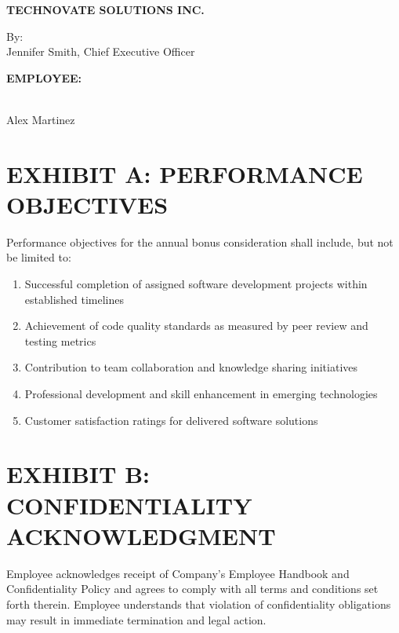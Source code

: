 \documentclass[12pt,letterpaper]{article}
\begin{document}
\vspace{1cm}
\noindent \textbf{TECHNOVATE SOLUTIONS INC.}

\vspace{0.5cm}
\noindent By: \underline{\hspace{3in}}\\
Jennifer Smith, Chief Executive Officer

\vspace{1cm}
\noindent \textbf{EMPLOYEE:}

\vspace{0.5cm}
\noindent \underline{\hspace{3in}}\\
Alex Martinez

\newpage

\section*{EXHIBIT A: PERFORMANCE OBJECTIVES}

Performance objectives for the annual bonus consideration shall include, but not be limited to:

\begin{enumerate}
    \item Successful completion of assigned software development projects within established timelines
    \item Achievement of code quality standards as measured by peer review and testing metrics
    \item Contribution to team collaboration and knowledge sharing initiatives
    \item Professional development and skill enhancement in emerging technologies
    \item Customer satisfaction ratings for delivered software solutions
\end{enumerate}

\section*{EXHIBIT B: CONFIDENTIALITY ACKNOWLEDGMENT}

Employee acknowledges receipt of Company's Employee Handbook and Confidentiality Policy and agrees to comply with all terms and conditions set forth therein. Employee understands that violation of confidentiality obligations may result in immediate termination and legal action.
\end{document}
